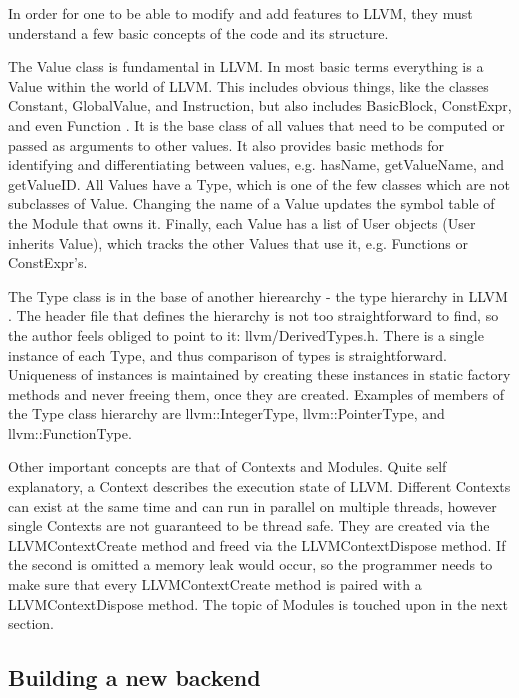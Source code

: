 \documentclass[parskip]{cs4rep}
\begin{document}
In order for one to be able to modify and add features to LLVM, they must understand a few basic concepts of the code and its structure.

The Value class is fundamental in LLVM. In most basic terms everything is a Value within the world of LLVM. This includes obvious things, like the classes Constant, GlobalValue, and Instruction, but also includes BasicBlock, ConstExpr, and even Function \cite{P9}. It is the base class of all values that need to be computed or passed as arguments to other values. It also provides basic methods for identifying and differentiating between values, e.g. hasName, getValueName, and getValueID. All Values have a Type, which is one of the few classes which are not subclasses of Value. Changing the name of a Value updates the symbol table of the Module that owns it. Finally, each Value has a list of User objects (User inherits Value), which tracks the other Values that use it, e.g. Functions or ConstExpr's.

The Type class is in the base of another hierearchy - the type hierarchy in LLVM \cite{P10}. The header file that defines the hierarchy is not too straightforward to find, so the author feels obliged to point to it: llvm/DerivedTypes.h. There is a single instance of each Type, and thus comparison of types is straightforward. Uniqueness of instances is maintained by creating these instances in static factory methods and never freeing them, once they are created. Examples of members of the Type class hierarchy are llvm::IntegerType, llvm::PointerType, and llvm::FunctionType.

Other important concepts are that of Contexts and Modules. Quite self explanatory, a Context describes the execution state of LLVM. Different Contexts can exist at the same time and can run in parallel on multiple threads, however single Contexts are not guaranteed to be thread safe. They are created via the LLVMContextCreate method and freed via the LLVMContextDispose method. If the second is omitted a memory leak would occur, so the programmer needs to make sure that every LLVMContextCreate method is paired with a LLVMContextDispose method. The topic of Modules is touched upon in the next section.

\subsection{Building a new backend} \label{sec:buildingANewBackend}
\end{document}
